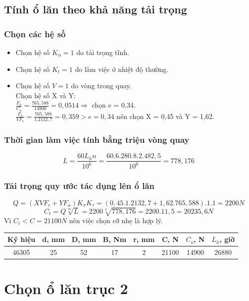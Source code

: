 \subsection{Tính ổ lăn theo khả năng tải trọng}
\subsubsection*{Chọn các hệ số}
\begin{itemize}
    \item Chọn hệ số $K_\alpha = 1$ do tải trọng tĩnh.
    \item Chọn hệ số $K_t = 1$ do làm việc ở nhiệt độ thường.
    \item Chọn hệ số $V = 1$ do vòng trong quay.\\
    Chọn hệ số X và Y: \\
    $\frac{F_a}{C_o} = \frac{765,588}{14900} = 0,0514 \Rightarrow$ chọn e = 0,34.\\
    $\frac{F_a}{VF_r} = \frac{765,588}{1.2132,7} = 0,359 > e = 0,34$ nên chọn X = 0,45 và Y = 1,62.
\end{itemize}
\subsubsection*{Thời gian làm việc tính bằng triệu vòng quay}
\[
    L = \frac{60L_hn}{10^6} = \frac{60.6.280.8.2.482,5}{10^6} = 778,176 
\]
\cleardoublepage
\subsubsection*{Tải trọng quy ước tác dụng lên ổ lăn}
\[
    Q = (XVF_r+YF_\alpha)K_\sigma K_\tau = (0,45.1.2132,7 + 1,62.765,588).1.1 = 2200N
\]
\[
    C_t = Q\sqrt[m]{L} =2200\sqrt[3]{778,176} = 2200.11,5 = 20235,6N
\]
Vì $C_t < C = 21100N$ nên việc chọn cỡ nhẹ là hợp lý.
\begin{center}
\begin{tabular}{|c|c|c|c|c|c|c|c|}
    \hline
       \textbf{Ký hiệu} & \textbf{d, mm} & \textbf{D, mm} & \textbf{B, Nm} & \textbf{r, mm} & \textbf{C, N} & \textbf{$C_o$, N} & \textbf{$L_h$, giờ} \\
    \hline
    46305 & 25 & 52 & 17 & 2 & 21100 & 14900 & 26880 \\
    \hline
\end{tabular}
\end{center}
\section{Chọn ổ lăn trục 2}
